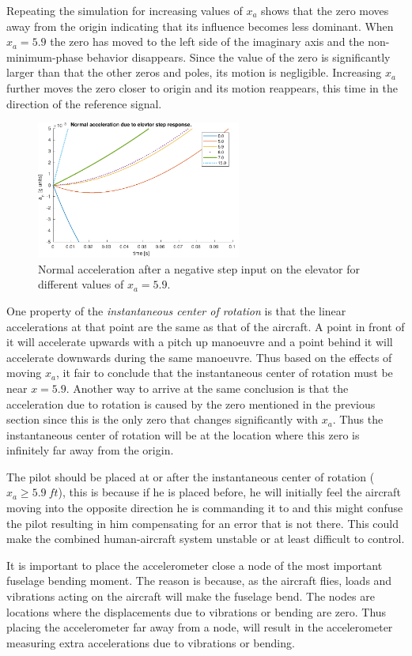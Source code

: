 Repeating the simulation for increasing values of $x_a$ shows that the zero moves away from the origin indicating that its influence becomes less dominant. When $x_a=5.9$ the zero has moved to the left side of the imaginary axis and the non-minimum-phase behavior disappears. Since the value of the zero is significantly larger than that the other zeros and poles, its motion is negligible. Increasing $x_a$ further moves the zero closer to origin and its motion reappears, this time in the direction of the reference signal.

\begin{figure}[h]
    \centering
    \includegraphics[width=0.6\textwidth]{figures/an_elev_step_mult}
    \caption{Normal acceleration after a negative step input on the elevator for different values of $x_a=5.9$.}
    \label{fig:an_elev_step_mult}
\end{figure}

One property of the \emph{instantaneous center of rotation} is that the linear accelerations at that point are the same as that of the aircraft. A point in front of it will accelerate upwards with a pitch up manoeuvre and a point behind it will accelerate downwards during the same manoeuvre. Thus based on the effects of moving $x_a$, it fair to conclude that the instantaneous center of rotation must be near $x=5.9$. Another way to arrive at the same conclusion is that the acceleration due to rotation is caused by the zero mentioned in the previous section since this is the only zero that changes significantly with $x_a$. Thus the instantaneous center of rotation will be at the location where this zero is infinitely far away from the origin.

The pilot should be placed at or after the instantaneous center of rotation ($x_a\geq5.9\ ft$), this is because if he is placed before, he will initially feel the aircraft moving into the opposite direction he is commanding it to and this might confuse the pilot resulting in him compensating for an error that is not there. This could make the combined human-aircraft system unstable or at least difficult to control.

It is important to place the accelerometer close a node of the most important fuselage bending moment. The reason is because, as the aircraft flies, loads and vibrations acting on the aircraft will make the fuselage bend. The nodes are locations where the displacements due to vibrations or bending are zero. Thus placing the accelerometer far away from a node, will result in the accelerometer measuring extra accelerations due to vibrations or bending. 
